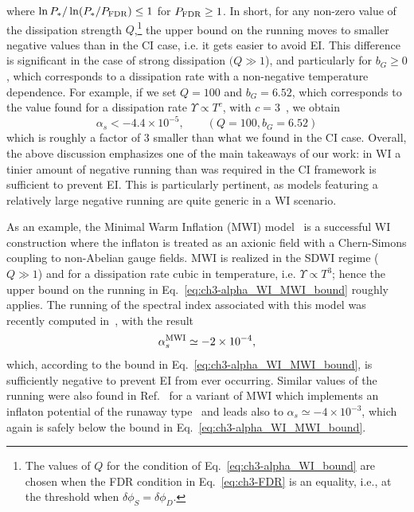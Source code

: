where $\ln
P_*/\ln(P_*/P_{\rm{FDR}})\leq1$ for $P_{\rm{FDR}}\geq1$. In short, for any non-zero value of the dissipation strength $Q$,\footnote{The values of $Q$
for the condition of Eq.~\ref{eq:ch3-alpha_WI_bound} are chosen when the
FDR condition in Eq.~\ref{eq:ch3-FDR} is an equality, i.e., at the
threshold when $\delta\phi_S=\delta\phi_D$.} the upper bound on the running moves to smaller negative values   than in the CI case, i.e. it gets easier to avoid EI. This difference is significant in the case of strong dissipation $(Q\gg 1$), and particularly for $b_G\geq 0$, which corresponds to a dissipation rate with a non-negative temperature dependence. For example,
if we set $Q = 100$ and $b_G = 6.52$, which corresponds to the value found for a dissipation rate
$\Upsilon\propto T^c$, with $c=3$~\cite{Montefalcone:2022jfw}, we obtain
\begin{equation}
    \alpha_s< -4.4 \times 10^{-5}, \qquad \text{$(Q=100, b_G=6.52)$}\label{eq:ch3-alpha_WI_MWI_bound}
\end{equation}
which is roughly a factor of $3$ smaller than what we found in the CI
case.
Overall, the above discussion emphasizes one of the main takeaways of our work: in WI a tinier amount of negative running than was required in the CI framework
is sufficient to prevent EI. This is particularly pertinent, as models featuring a relatively large negative running are quite generic in a WI scenario.

As an example, the Minimal Warm Inflation (MWI) model~\cite{Berghaus:2019whh} is a successful WI construction where the
inflaton is treated as an axionic field with a Chern-Simons coupling
to non-Abelian gauge fields. MWI is realized in the SDWI regime ($Q\gg1$) and for a dissipation rate cubic in temperature, i.e. $\Upsilon\propto T^3$; hence the upper bound on the running in Eq.~\ref{eq:ch3-alpha_WI_MWI_bound} roughly applies. The running of the
spectral index associated with this model was recently computed in~\cite{Das:2022ubr}, with the result
\begin{equation}
\alpha_s^{\rm{MWI}}\simeq -2\times 10^{-4}, \label{eq:ch3-alpha_MWI_computed}
\end{equation}
which, according to the bound in Eq.~\ref{eq:ch3-alpha_WI_MWI_bound}, is
sufficiently negative to prevent EI from ever occurring. Similar
values of  the running were also found in Ref.~\cite{Das:2022ubr} for
a variant of MWI which implements an inflaton potential of the runaway
type~\cite{Das:2020xmh} and leads also to $\alpha_s\simeq
-4\times10^{-3}$, which again is safely below the bound in
Eq.~\ref{eq:ch3-alpha_WI_MWI_bound}.

